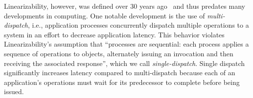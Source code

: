 

Linearizability, however, was defined over 30 years ago~\cite{herlihy1990linearizability,herlihy1987linearizability} and thus predates many developments in computing.
One notable development is the use of \textit{multi-dispatch}, i.e., application processes concurrently dispatch multiple operations to a system in an effort to
decrease application latency.
This behavior violates Linearizability's assumption that  
``processes are sequential: each process applies a sequence
of operations to objects, alternately issuing an invocation and then receiving the associated response'', which we call \textit{single-dispatch}.
Single dispatch significantly increases latency compared to multi-dispatch because each of an application's operations must wait for its predecessor to  complete before being issued.




